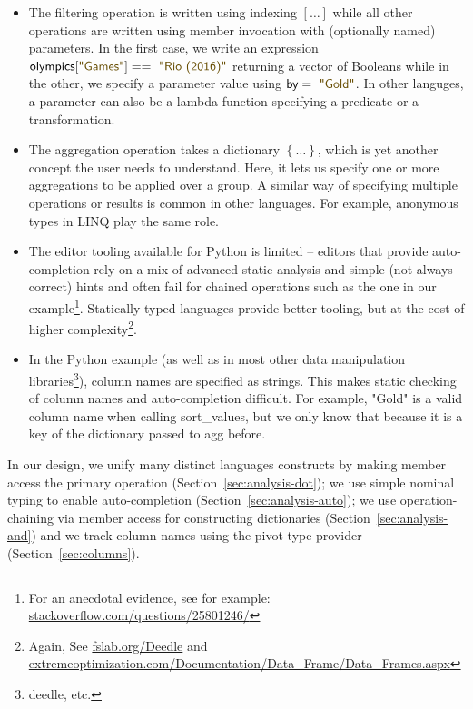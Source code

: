 \documentclass[a4paper,UKenglish]{lipics-v2016}
\theoremstyle{plain}
\theoremstyle{definition}
\newcommand{\str}[1]{\textnormal{\textcolor{strclr}{\sffamily "#1"}}}
\newcommand{\ident}[1]{\textnormal{\sffamily #1}}
\begin{document}
\begin{itemize}
\item The filtering operation is written using indexing $[\ldots]$ while all other operations are
  written using member invocation with (optionally named) parameters. In the first case, we write
  an expression $\ident{olympics}[\str{Games}]==\str{Rio (2016)}$ returning a vector of Booleans
  while in the other, we specify a parameter value using $\ident{by}=\str{Gold}$. In other languges,
  a parameter can also be a lambda function specifying a predicate or a transformation.
  
\item The aggregation operation takes a dictionary $\left\{\ldots\right\}$, which is yet another
  concept the user needs to understand. Here, it lets us specify one or more aggregations to
  be applied over a group. A similar way of specifying multiple operations or results is common 
  in other languages. For example, anonymous types in LINQ play the same role.
      
\item The editor tooling available for Python is limited -- editors that provide auto-completion
  rely on a mix of advanced static analysis and simple (not always correct) hints and often fail
  for chained operations such as the one in our example\footnote{For an anecdotal evidence,
  see for example: \url{stackoverflow.com/questions/25801246/}}. Statically-typed languages
  provide better tooling, but at the cost of higher complexity\footnote{Again,
  See \url{fslab.org/Deedle}
  and \url{extremeoptimization.com/Documentation/Data_Frame/Data_Frames.aspx} }.

\item In the Python example (as well as in most other data manipulation 
  libraries\footnote{deedle, etc.}), column names are specified as strings. This makes static 
  checking of column names and auto-completion difficult. For example, \str{Gold} is a valid 
  column name when calling \ident{sort\_values}, but we only know that because it is a key of the 
  dictionary passed to \ident{agg} before.
\end{itemize}

\noindent
In our design, we unify many distinct languages constructs by making member
access the primary operation (Section~\ref{sec:analysis-dot}); we use simple nominal typing to
enable auto-completion (Section~\ref{sec:analysis-auto}); we use operation-chaining via member access
for constructing dictionaries (Section~\ref{sec:analysis-and}) and we track column names using the 
pivot type provider (Section~\ref{sec:columns}).
\end{document}
